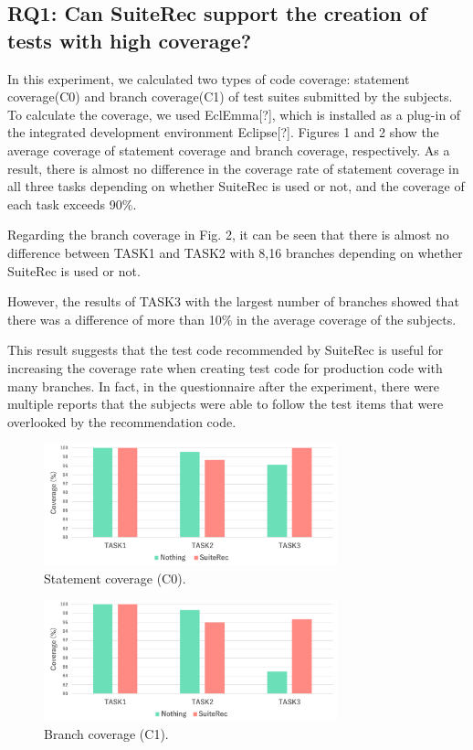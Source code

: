 \documentclass[conference]{IEEEtran}
\begin{document}
\subsection{RQ1: Can SuiteRec support the creation of tests with high coverage?}
In this experiment, we calculated two types of code coverage: statement coverage(C0) and branch coverage(C1) of test suites submitted by the subjects. To calculate the coverage, we used EclEmma[?], which is installed as a plug-in of the integrated development environment Eclipse[?]. Figures 1 and 2 show the average coverage of statement coverage and branch coverage, respectively. As a result, there is almost no difference in the coverage rate of statement coverage in all three tasks depending on whether SuiteRec is used or not, and the coverage of each task exceeds 90\%.

Regarding the branch coverage in Fig. 2, it can be seen that there is almost no difference between TASK1 and TASK2 with 8,16 branches depending on whether SuiteRec is used or not. 

However, the results of TASK3 with the largest number of branches showed that there was a difference of more than 10\% in the average coverage of the subjects.

This result suggests that the test code recommended by SuiteRec is useful for increasing the coverage rate when creating test code for production code with many branches. In fact, in the questionnaire after the experiment, there were multiple reports that the subjects were able to follow the test items that were overlooked by the recommendation code.


\begin{figure}[htbp]
\centerline{\includegraphics[width=8.5cm]{C0.pdf}}
\caption{Statement coverage (C0).}
\label{fig}
\end{figure}

\begin{figure}[htbp]
\centerline{\includegraphics[width=8.5cm]{C1.pdf}}
\caption{Branch coverage (C1).}
\label{fig}
\end{figure}
\end{document}
